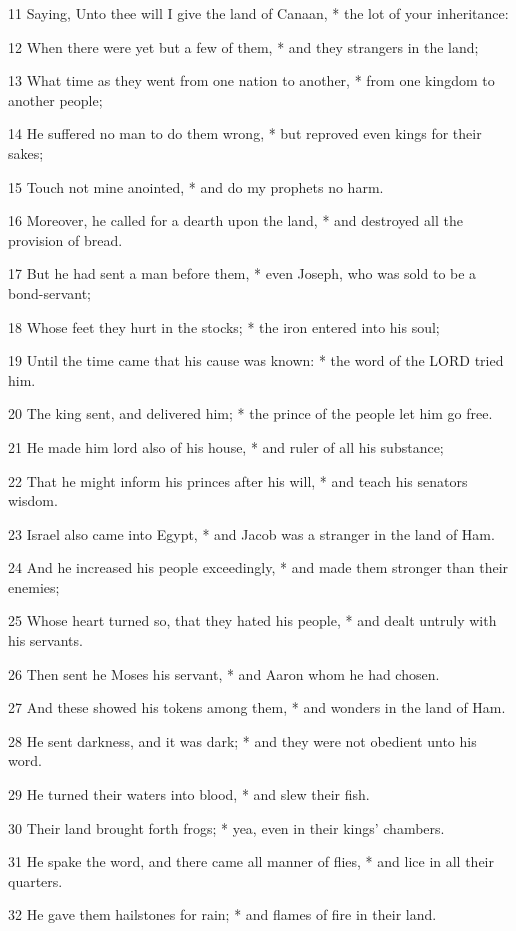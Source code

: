 11 Saying, Unto thee will I give the land of Canaan,
* the lot of your inheritance:

12 When there were yet but a few of them, * and they
strangers in the land;

13 What time as they went from one nation to another,
* from one kingdom to another people;

14 He suffered no man to do them wrong, * but reproved
even kings for their sakes;

15 Touch not mine anointed, * and do my prophets no
harm.

16 Moreover, he called for a dearth upon the land,
* and destroyed all the provision of bread.

17 But he had sent a man before them, * even Joseph,
who was sold to be a bond-servant;

18 Whose feet they hurt in the stocks; * the iron entered
into his soul;

19 Until the time came that his cause was known: *
the word of the LORD tried him.

20 The king sent, and delivered him; * the prince of
the people let him go free.

21 He made him lord also of his house, * and ruler
of all his substance;

22 That he might inform his princes after his will,
* and teach his senators wisdom.

23 Israel also came into Egypt, * and Jacob was a stranger
in the land of Ham.

24 And he increased his people exceedingly, * and made
them stronger than their enemies;

25 Whose heart turned so, that they hated his people,
* and dealt untruly with his servants.

26 Then sent he Moses his servant, * and Aaron whom
he had chosen.

27 And these showed his tokens among them, * and wonders
in the land of Ham.

28 He sent darkness, and it was dark; * and they were
not obedient unto his word.

29 He turned their waters into blood, * and slew their
fish.

30 Their land brought forth frogs; * yea, even in their
kings' chambers.

31 He spake the word, and there came all manner of
flies, * and lice in all their quarters.

32 He gave them hailstones for rain; * and flames of
fire in their land.

